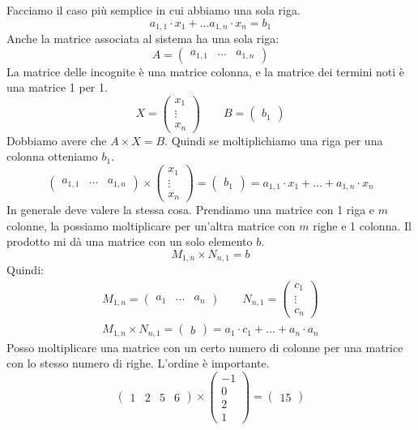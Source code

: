 Facciamo il caso pi\`u semplice in cui abbiamo una sola riga.
\[
a_{1,1} \cdot x_1 + \dots a_{1,n} \cdot x_n = b_1
\]
Anche la matrice associata al sistema ha una sola riga:
\[
A = 
\begin{pmatrix}
a_{1,1} & \dots & a_{1,n}
\end{pmatrix}
\]
La matrice delle incognite \`e una matrice colonna, e la matrice dei termini noti \`e una matrice 1 per 1.
\[
X = 
\begin{pmatrix}
x_1 \\
\vdots \\
x_n
\end{pmatrix}
\qquad
B = 
\begin{pmatrix}
b_1
\end{pmatrix}
\]
Dobbiamo avere che $A \times X = B$. Quindi se moltiplichiamo una riga per una colonna otteniamo $b_1$.
\[
\begin{pmatrix}
a_{1,1} & \dots & a_{1,n}
\end{pmatrix}
\times
\begin{pmatrix}
x_1 \\
\vdots \\
x_n
\end{pmatrix} 
=
\begin{pmatrix}
b_1
\end{pmatrix}
=
a_{1,1} \cdot x_1 + \ldots + a_{1,n} \cdot x_n
\]
In generale deve valere la stessa cosa. Prendiamo una matrice con 1 riga e $m$ colonne, la possiamo moltiplicare per un'altra matrice con $m$ righe e 1 colonna. Il prodotto mi d\`a una matrice con un solo elemento $b$.
\[
M_{1, n} \times N_{n, 1} = b
\]
Quindi:
\begin{gather*}
M_{1, n} = 
\begin{pmatrix}
a_1 & \dots & a_n
\end{pmatrix}
\qquad
N_{n, 1} = 
\begin{pmatrix}
c_1 \\
\vdots \\
c_n
\end{pmatrix}
\\
M_{1, n} \times N_{n, 1} = 
\begin{pmatrix}
b
\end{pmatrix}
= a_1 \cdot c_1 + \ldots + a_n \cdot a_n
\end{gather*}
Posso moltiplicare una matrice con un certo numero di colonne per una matrice con lo stesso numero di righe. L'ordine \`e importante.
\[
\begin{pmatrix}
1 & 2 & 5 & 6 
\end{pmatrix}
\times
\begin{pmatrix}
- 1 \\
0 \\
2 \\
1
\end{pmatrix}
=
\begin{pmatrix}
15
\end{pmatrix}
\]
